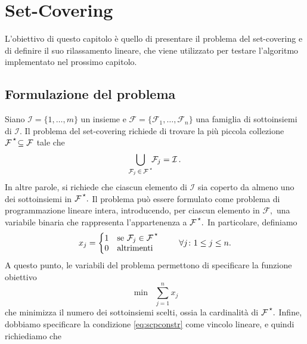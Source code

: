\chapter{Set-Covering}
L'obiettivo di questo capitolo è quello di presentare il problema del set-covering e di definire il suo rilassamento
lineare, che viene utilizzato per testare l'algoritmo implementato nel prossimo capitolo.

\section{Formulazione del problema}
Siano
\(
\mathcal{I} = \{1, \ldots, m\}
\)
un insieme e \( \mathcal{F} = \{\mathcal{F}_1,\ldots,\mathcal{F}_n\} \) una famiglia di sottoinsiemi di
\(
    \mathcal{I}.
\)
Il problema del set-covering richiede di trovare la più piccola
collezione
\(
    \mathcal{F}^{\,\text{\raisebox{2pt}{$\star$}}} \!\subseteq \mathcal{F}
\)
tale che
\begin{equation}\label{eq:scpconstr}
    \bigcup_{\mathcal{F}_j \, \in \, \mathcal{F^{\,\text{\raisebox{2pt}{$\star$}}}}} \!\!\mathcal{F}_j = \mathcal{I}\,.
\end{equation}
In altre parole, si richiede che ciascun elemento di \( \mathcal{I} \) sia coperto da almeno uno dei sottoinsiemi in
\(
    \mathcal{F}^{\,\text{\raisebox{2pt}{$\star$}}}.
\)
Il problema può essere formulato come problema di programmazione lineare intera, introducendo, per ciascun elemento in
\(
    \mathcal{F},
\)
una variabile binaria che rappresenta l'appartenenza a
\(
    \mathcal{F}^{\,\text{\raisebox{2pt}{$\star$}}}.
\)
In particolare, definiamo
\begin{equation}
    x_j = \scalebox{1.05}{\bigg\{}
    \begin{array}{@{}ll}
        1 & \text{se } \mathcal{F}_j \in \mathcal{F}^{\,\text{\raisebox{2pt}{$\star$}}} \\
        0 & \text{altrimenti}
    \end{array}\qquad \forall j\colon 1 \leq j \leq n.
\end{equation}
A questo punto, le variabili del problema permettono di specificare la funzione obiettivo
\begin{equation}
    \min \;\;\sum_{j = 1}^n x_j
\end{equation}
che minimizza il numero dei sottoinsiemi scelti, ossia la cardinalità di
\(
    \mathcal{F}^{\,\text{\raisebox{2pt}{$\star$}}}.
\)
Infine, dobbiamo specificare la condizione \eqref{eq:scpconstr} come vincolo lineare, e quindi richiediamo che
